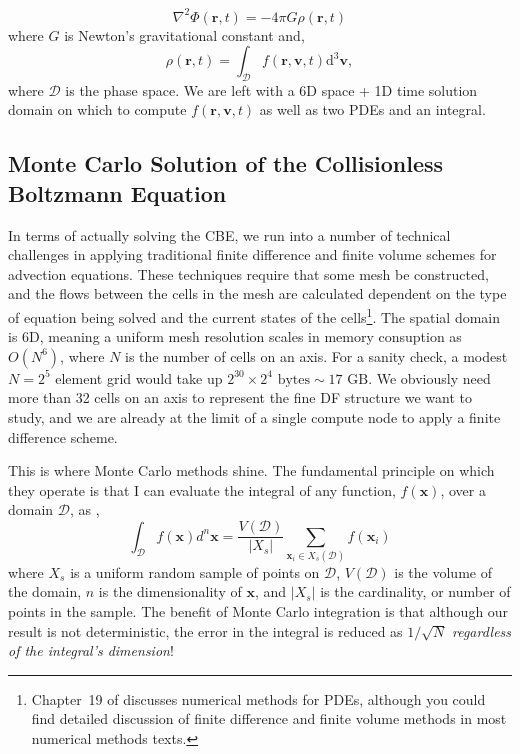 \begin{equation}
\nabla^2 \Phi(\textbf{r},t) = -4 \pi G \rho(\textbf{r},t)
\end{equation} 
where $G$ is Newton's gravitational constant and,
\begin{equation}
\rho(\textbf{r},t) = \int_{\mathcal{D}} f(\textbf{r}, \textbf{v}, t) \text{d}^3 \textbf{v},
\end{equation}
where $\mathcal{D}$ is the phase space. We are left with a 6D space + 1D time solution domain on which to compute $f(\textbf{r},\textbf{v},t)$ as well as two PDEs and an integral.

\subsection{Monte Carlo Solution of the Collisionless Boltzmann Equation}

In terms of actually solving the CBE, we run into a number of technical challenges in applying traditional finite difference and finite volume schemes for advection equations. These techniques require that some mesh be constructed, and the flows between the cells in the mesh are calculated dependent on the type of equation being solved and the current states of the cells\footnote{Chapter~19 of \citet{numerical_recipes_fortran} discusses numerical methods for PDEs, although you could find detailed discussion of finite difference and finite volume methods in most numerical methods texts.}. The spatial domain is 6D, meaning a uniform mesh resolution scales in memory consuption as $O(N^6)$, where $N$ is the number of cells on an axis. For a sanity check, a modest $N = 2^5$ element grid would take up $2^{30} \times 2^4 \text{ bytes} \sim 17 \text{ GB}$. We obviously need more than 32 cells on an axis to represent the fine DF structure we want to study, and we are already at the limit of a single compute node to apply a finite difference scheme. 

This is where Monte Carlo methods shine. The fundamental principle on which they operate is that I can evaluate the integral of any function, $f(\textbf{x})$, over a domain $\mathcal{D}$, as \citep{numerical_recipes_fortran},
\begin{equation}
\int_\mathcal{D} f(\textbf{x}) d^{n} \textbf{x} = \frac{V(\mathcal{D})}{\vert X_s \vert} \sum_{\textbf{x}_i \in X_s(\mathcal{D})} f(\textbf{x}_i)
\end{equation}
where $X_s$ is a uniform random sample of points on $\mathcal{D}$, $V(\mathcal{D})$ is the volume of the domain, $n$ is the dimensionality of $\textbf{x}$, and $\vert X_s \vert$ is the cardinality, or number of points in the sample. The benefit of Monte Carlo integration is that although our result is not deterministic, the error in the integral is reduced as $1/\sqrt{N}$ \textit{regardless of the integral's dimension}! 

